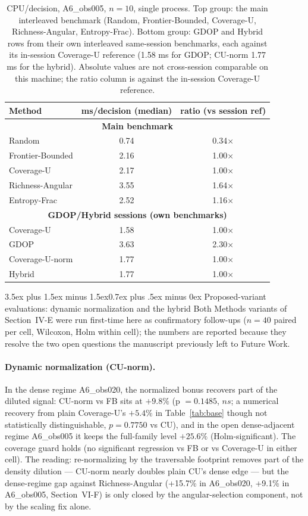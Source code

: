 \documentclass[journal]{IEEEtran}
\makeatletter
\newcommand{\CU}{Coverage-U}
\newcommand{\FB}{Frontier-Bounded}
\newcommand{\RA}{Richness-Angular}
\renewcommand{\subsection}{\@startsection{subsection}{2}{\z@}%
{3.5ex plus 1.5ex minus 1.5ex}{0.7ex plus .5ex minus 0ex}%
{\normalfont\normalsize\bfseries}}
\makeatother
\begin{document}
\begin{table}[t]
\caption{CPU/decision, A6\_obs005, $n = 10$, single process. Top group: the
main interleaved benchmark (Random, \FB, \CU, \RA, Entropy-Frac). Bottom group:
GDOP and Hybrid rows from their own interleaved same-session benchmarks, each
against its in-session \CU{} reference (1.58 ms for GDOP; CU-norm 1.77 ms for
the hybrid). Absolute values are not cross-session comparable on this machine;
the ratio column is against the in-session \CU{} reference.}
\label{tab:cpu}
\centering
\begin{tabular}{l c c}
\toprule
Method & ms/decision (median) & ratio (vs session ref) \\
\midrule
\multicolumn{3}{c}{\textbf{Main benchmark}} \\
\midrule
Random & 0.74 & 0.34$\times$ \\
Frontier-Bounded & 2.16 & 1.00$\times$ \\
Coverage-U & 2.17 & 1.00$\times$ \\
Richness-Angular & 3.55 & 1.64$\times$ \\
Entropy-Frac & 2.52 & 1.16$\times$ \\
\midrule
\multicolumn{3}{c}{\textbf{GDOP/Hybrid sessions (own benchmarks)}} \\
\midrule
Coverage-U & 1.58 & 1.00$\times$ \\
GDOP & 3.63 & 2.30$\times$ \\
Coverage-U-norm & 1.77 & 1.00$\times$ \\
Hybrid & 1.77 & 1.00$\times$ \\
\bottomrule
\end{tabular}
\end{table}


\subsection{Proposed-variant evaluations: dynamic normalization and the hybrid}
\label{sub:variants}
Both Methods variants of Section~IV-E were run first-time here as confirmatory
follow-ups ($n = 40$ paired per cell, Wilcoxon, Holm within cell); the numbers
are reported because they resolve the two open questions the manuscript
previously left to Future Work.

\paragraph{Dynamic normalization (CU-norm).}
In the dense regime A6\_obs020, the normalized bonus recovers part of the
diluted signal: CU-norm vs FB sits at $+9.8\%$ (p $= 0.1485$, $ns$; a numerical
recovery from plain \CU's{} $+5.4\%$ in Table~\ref{tab:base} though not
statistically distinguishable, $p = 0.7750$ vs CU), and in the open dense-adjacent
regime A6\_obs005 it keeps the full-family level $+25.6\%$ (Holm-significant).
The coverage guard holds (no significant regression vs FB or vs \CU{} in either
cell). The reading: re-normalizing by the traversable footprint removes part of
the density dilution --- CU-norm nearly doubles plain CU's dense edge --- but
the dense-regime gap against \RA{} (+15.7\% in A6\_obs020, +9.1\% in A6\_obs005,
Section~VI-F) is only
closed by the angular-selection component, not by the scaling fix alone.
\end{document}
